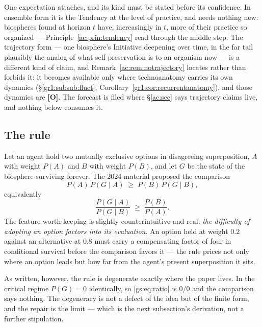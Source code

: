 \documentclass[11pt]{article}
\numberwithin{equation}{section}
\theoremstyle{plain}
\theoremstyle{definition}
\theoremstyle{remark}
\begin{document}
One expectation attaches, and its kind must be stated before its confidence. In ensemble form it is the Tendency at the level of practice, and needs nothing new: biospheres found at horizon $t$ have, increasingly in $t$, more of their practice so organized --- Principle~\ref{ac:prin:tendency} read through the middle step. The trajectory form --- one biosphere's Initiative deepening over time, in the far tail plausibly the analog of what self-preservation is to an organism now --- is a different kind of claim, and Remark~\ref{ac:rem:notrajectory} locates rather than forbids it: it becomes available only where technoanatomy carries its own dynamics (\S\ref{gr1:subsub:fluct}, Corollary~\ref{gr1:cor:recurrentanatomy}), and those dynamics are \textbf{[O]}. The forecast is filed where \S\ref{ac:sec} says trajectory claims live, and nothing below consumes it.

\subsection{The rule}\label{gs:sub:rule}

Let an agent hold two mutually exclusive options in disagreeing superposition, $A$ with weight $P(A)$ and $B$ with weight $P(B)$, and let $G$ be the state of the biosphere surviving forever. The 2024 material proposed the comparison
\begin{equation}\label{gs:eq:rule}
    P(A)\,P(G \mid A) \;\ge\; P(B)\,P(G \mid B),
\end{equation}
equivalently
\begin{equation}\label{gs:eq:ratio}
    \frac{P(G \mid A)}{P(G \mid B)} \;\ge\; \frac{P(B)}{P(A)}.
\end{equation}
The feature worth keeping is slightly counterintuitive and real: \emph{the difficulty of adopting an option factors into its evaluation}. An option held at weight $0.2$ against an alternative at $0.8$ must carry a compensating factor of four in conditional survival before the comparison favors it --- the rule prices not only where an option leads but how far from the agent's present superposition it sits.

As written, however, the rule is degenerate exactly where the paper lives. In the critical regime $P(G) = 0$ identically, so \eqref{gs:eq:ratio} is $0/0$ and the comparison says nothing. The degeneracy is not a defect of the idea but of the finite form, and the repair is the limit --- which is the next subsection's derivation, not a further stipulation.
\end{document}
